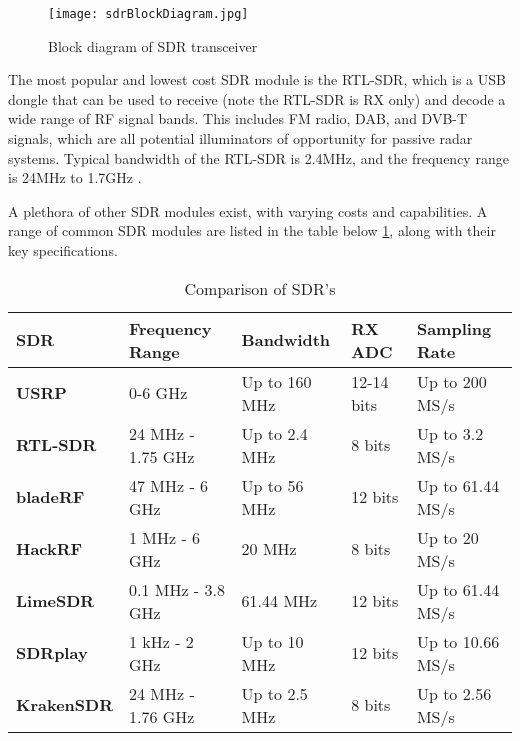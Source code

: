 \begin{figure}[htbp]
    \centering
    \texttt{[image: sdrBlockDiagram.jpg]}
    \caption{Block diagram of SDR transceiver \cite{SDRgeneralInfo}}
    \label{fig:SDRblock}
\end{figure}


\par \vspace{0.5cm}
The most popular and lowest cost SDR module is the RTL-SDR, which is a USB dongle that can be used to receive (note the RTL-SDR is RX only) and decode a wide range of RF signal bands. This includes FM radio, DAB, and DVB-T signals, which are all potential illuminators of opportunity for passive radar systems. Typical bandwidth of the RTL-SDR is 2.4MHz, and the frequency range is 24MHz to 1.7GHz \cite{SDRdongle}.

A plethora of other SDR modules exist, with varying costs and capabilities. A range of common SDR modules are listed in the table below \ref{tab:SDRcomparison}, along with their key specifications. 

\begin{table}[h!]
    \centering
    \caption{Comparison of SDR's \cite{SDRmoduleComparison} \label{tab:SDRcomparison}}
    \begin{tabular}{|l|l|l|l|l|}
    \hline
    \textbf{SDR} & \textbf{Frequency Range} & \textbf{Bandwidth} & \textbf{RX ADC} & \textbf{Sampling Rate} \\ \hline
    \textbf{USRP} & 0-6 GHz & Up to 160 MHz & 12-14 bits & Up to 200 MS/s \\ \hline
    \textbf{RTL-SDR} & 24 MHz - 1.75 GHz & Up to 2.4 MHz & 8 bits & Up to 3.2 MS/s \\ \hline
    \textbf{bladeRF} & 47 MHz - 6 GHz & Up to 56 MHz & 12 bits & Up to 61.44 MS/s \\ \hline
    \textbf{HackRF} & 1 MHz - 6 GHz & 20 MHz & 8 bits & Up to 20 MS/s \\ \hline
    \textbf{LimeSDR} & 0.1 MHz - 3.8 GHz & 61.44 MHz & 12 bits & Up to 61.44 MS/s \\ \hline
    \textbf{SDRplay} & 1 kHz - 2 GHz & Up to 10 MHz & 12 bits & Up to 10.66 MS/s \\ \hline
    \textbf{KrakenSDR} & 24 MHz - 1.76 GHz & Up to 2.5 MHz & 8 bits & Up to 2.56 MS/s \\ \hline
    \end{tabular}
\end{table}

